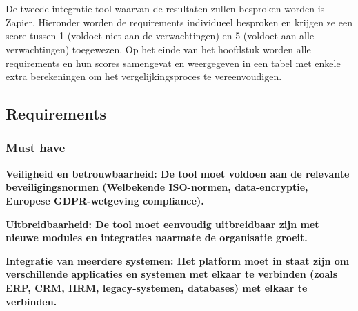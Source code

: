 \chapter{}
\label{ch:Zapier}

De tweede integratie tool waarvan de resultaten zullen besproken worden is Zapier. Hieronder worden de requirements individueel besproken en krijgen ze een score tussen 1 (voldoet niet aan de verwachtingen) en 5 (voldoet aan alle verwachtingen) toegewezen. Op het einde van het hoofdstuk worden alle requirements en hun scores samengevat en weergegeven in een tabel met enkele extra berekeningen om het vergelijkingsproces te vereenvoudigen.

\section{Requirements}%
\label{RequirementsZapier}

\subsection{Must have}%
\label{MustHaveZapier}

\textbf{Veiligheid en betrouwbaarheid: De tool moet voldoen aan de relevante beveiligingsnormen (Welbekende ISO-normen, data-encryptie, Europese GDPR-wetgeving compliance).}

\vspace{\baselineskip}



\vspace{\baselineskip}

\textbf{Uitbreidbaarheid: De tool moet eenvoudig uitbreidbaar zijn met nieuwe modules en integraties naarmate de organisatie groeit.}

\vspace{\baselineskip}



\vspace{\baselineskip}

\textbf{Integratie van meerdere systemen: Het platform moet in staat zijn om verschillende applicaties en systemen met elkaar te verbinden (zoals ERP, CRM, HRM, legacy-systemen, databases) met elkaar te verbinden.}

\vspace{\baselineskip}



\vspace{\baselineskip}

